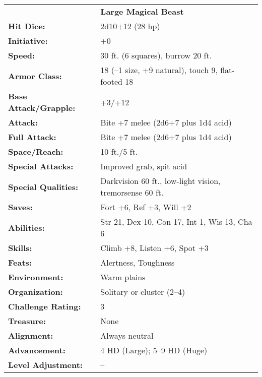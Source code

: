 \documentclass[../main.tex]{subfiles}
\begin{document}

  \begin{table}[H]
    \centering
    \begin{tabular}{lp{12em}}
      & \textbf{Large Magical Beast} \\
      \textbf{Hit Dice:} & 2d10+12 (28 hp) \\
      \textbf{Initiative:} & +0 \\
      \textbf{Speed:} & 30 ft. (6 squares), burrow 20 ft. \\
      \textbf{Armor Class:} & 18 (–1 size, +9 natural), touch 9, flat-footed 18 \\
      \textbf{Base Attack/Grapple:} & +3/+12 \\
      \textbf{Attack:} & Bite +7 melee (2d6+7 plus 1d4 acid) \\
      \textbf{Full Attack:} & Bite +7 melee (2d6+7 plus 1d4 acid) \\
      \textbf{Space/Reach:} & 10 ft./5 ft. \\
      \textbf{Special Attacks:} & Improved grab, spit acid \\
      \textbf{Special Qualities:} & Darkvision 60 ft., low-light vision, tremorsense 60 ft. \\
      \textbf{Saves:} & Fort +6, Ref +3, Will +2 \\
      \textbf{Abilities:} & Str 21, Dex 10, Con 17, Int 1, Wis 13, Cha 6 \\
      \textbf{Skills:} & Climb +8, Listen +6, Spot +3 \\
      \textbf{Feats:} & Alertness, Toughness \\
      \textbf{Environment:} & Warm plains \\
      \textbf{Organization:} & Solitary or cluster (2–4) \\
      \textbf{Challenge Rating:} & 3 \\
      \textbf{Treasure:} & None \\
      \textbf{Alignment:} & Always neutral \\
      \textbf{Advancement:} & 4 HD (Large); 5–9 HD (Huge) \\
      \textbf{Level Adjustment:} & -- \\
    \end{tabular}
  \end{table}
\end{document}
